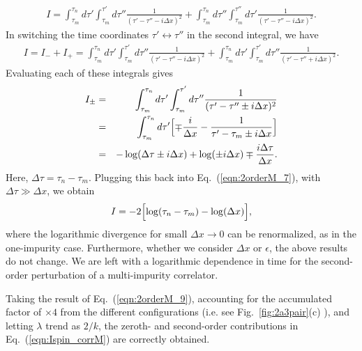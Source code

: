 \documentclass[aps,prb,twocolumn,superscriptaddress]{revtex4-1}
\begin{document}
\begin{widetext}
\begin{eqnarray}
I=\int_{\tau_{m}}^{\tau_{n}} d\tau' \int_{\tau_{m}}^{\tau'}d\tau'' \frac{1}{(\tau'-\tau''-i\Delta{x})^{2}}+\int_{\tau_{m}}^{\tau_{n}} d\tau'' \int_{\tau_{m}}^{\tau''}d\tau' \frac{1}{(\tau'-\tau''-i\Delta{x})^{2}}. \label{eqn:2orderM_6}
\end{eqnarray}
In switching the time coordinates $\tau'\leftrightarrow\tau''$ in the second integral, we have 
\begin{eqnarray}
I=I_{-}+I_{+}=\int_{\tau_{m}}^{\tau_{n}} d\tau' \int_{\tau_{m}}^{\tau'}d\tau'' \frac{1}{(\tau'-\tau''-i\Delta{x})^{2}}+\int_{\tau_{m}}^{\tau_{n}} d\tau' \int_{\tau_{m}}^{\tau'}d\tau'' \frac{1}{(\tau'-\tau''+i\Delta{x})^{2}}. \label{eqn:2orderM_7}
\end{eqnarray}
Evaluating each of these integrals gives
\begin{eqnarray}
I_{\pm}&=&\int_{\tau_{m}}^{\tau_{n}}d\tau' \int_{\tau_{m}}^{\tau'}d\tau'' \frac{1}{(\tau'-\tau''\pm i\Delta{x})^{2}} \\
&=&\int_{\tau_{m}}^{\tau_{n}}d\tau'\Bigl[\mp\frac{i}{\Delta{x}}-\frac{1}{\tau'-\tau_{m}\pm i\Delta{x}}\Bigr] \\
&=&-\log(\Delta{\tau}\pm i\Delta{x})+\log(\pm i\Delta{x})\mp\frac{i\Delta{\tau}}{\Delta{x}}. \label{eqn:2orderM_8}
\end{eqnarray}
Here, $\Delta{\tau}=\tau_{n}-\tau_{m}$. Plugging this back into Eq.~(\ref{eqn:2orderM_7}), with $\Delta\tau\gg\Delta{x}$, we obtain
\begin{eqnarray}
I=-2\Bigl[\log(\tau_{n}-\tau_{m})-\log(\Delta{x})\Bigr], \label{eqn:2orderM_9}
\end{eqnarray}
where the logarithmic divergence for small $\Delta{x}\to0$ can be renormalized, as in the one-impurity case. Furthermore, whether we consider $\Delta{x}$ or $\epsilon$, the above results do not change. We are left with a logarithmic dependence in time for the second-order perturbation of a multi-impurity correlator. 

Taking the result of Eq.~(\ref{eqn:2orderM_9}), accounting for the accumulated factor of $\times4$ from the different configurations (i.e. see Fig.~\ref{fig:2a3pair}(c) ), and letting $\lambda$ trend as $2/k$, the zeroth- and second-order contributions in Eq.~(\ref{eqn:Ispin_corrM}) are correctly obtained.

\end{widetext}
\end{document}
